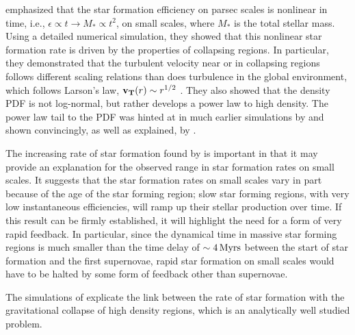\documentclass[../dissertation.tex]{subfiles}
\begin{document}
\citet{2015ApJ...800...49L} emphasized that the star formation efficiency on 
parsec scales is nonlinear 
in time, i.e., $\epsilon \propto t \rightarrow M_* \propto t^2$, on small scales, where $M_*$ is the total stellar mass. 
Using a detailed numerical simulation, they showed that this nonlinear star formation 
rate is driven by the properties of collapsing regions.
In particular, they demonstrated that the turbulent velocity near or in collapsing regions follows 
different scaling relations than does turbulence in the global environment, which follows
Larson's law, $\mathbf{v_T} (r)\sim r^{1/2}$ \citep{1981MNRAS.194..809L}. 
They also showed that the density PDF 
is not log-normal, but rather develops a power law to high density.
The power law tail to the  PDF  was hinted at in much earlier simulations by \citet{2000ApJ...535..869K} and shown convincingly, 
as well as explained, by \citet{2011ApJ...727L..20K}. 

The increasing rate of star formation found by \citet{2015ApJ...800...49L} is important 
in that it may provide an explanation for the observed range in star formation rates on 
small scales.  It suggests that the star formation rates on small scales 
vary in part because of the age of the star forming region; slow star forming 
regions, with very low instantaneous efficiencies, will ramp up their stellar production over time. If this result
can be firmly established, it will highlight the need for a form of very rapid 
feedback. In particular, since the dynamical time in massive star forming regions 
is much smaller than the time delay of $\sim 4{\,\rm Myrs}$ between the start of star 
formation and the first supernovae, rapid star formation on small scales would 
have to be halted by some form of feedback other than supernovae. 

The simulations of  \citet{2015ApJ...800...49L} explicate the link between the rate of star formation with the gravitational collapse of high density regions, which  is  an analytically well studied problem. 

\subsection{\citet{2015ApJ...804...44M}} \label{MC15_model}
\end{document}
